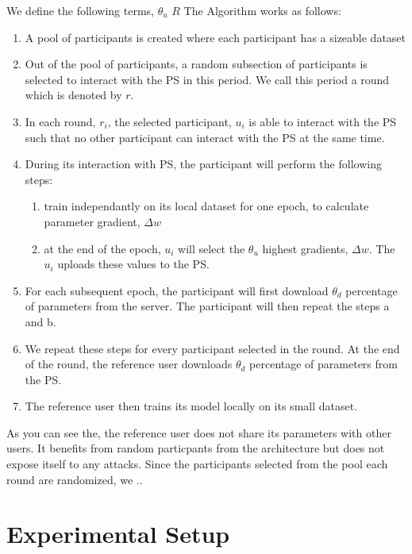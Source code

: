 \documentclass[conference]{IEEEtran}
\begin{document}
 
We define the following terms, $\theta_u$
$R$
The Algorithm works as follows:
\begin {enumerate}
\item A pool of participants is created where each participant has a sizeable dataset
\item Out of the pool of participants, a random subsection of participants is selected to interact with the PS in this period. We call this period a round which is denoted by $r$.
\item In each round, $r_i$, the selected participant, $u_i$ is able to interact with the PS such that no other participant can interact with the PS at the same time.
\item During its interaction with PS, the participant will perform the following steps:
\begin {enumerate}
  \item train independantly on its local dataset for one epoch, to calculate parameter gradient, $\Delta w$ 
  \item  at the end of the epoch, $u_i$ will select the $\theta_u$ highest gradients, $\Delta w$. The $u_i$ uploads these values to the PS.
  \end {enumerate}
\item For each subsequent epoch, the participant will first download $\theta_d$ percentage of parameters from the server. The participant will then repeat the steps a and b.
\item We repeat these steps for every participant selected in the round. At the end of the round, the reference user downloads $\theta_d$ percentage of parameters from the PS.
\item The reference user then trains its model locally on its small dataset. 

\end {enumerate}
As you can see the, the reference user does not share its parameters with other users. It benefits from random particpants from the architecture but does not expose itself to any attacks. Since the participants selected from the pool each round are randomized, we ..



\section{Experimental Setup}
\end{document}
